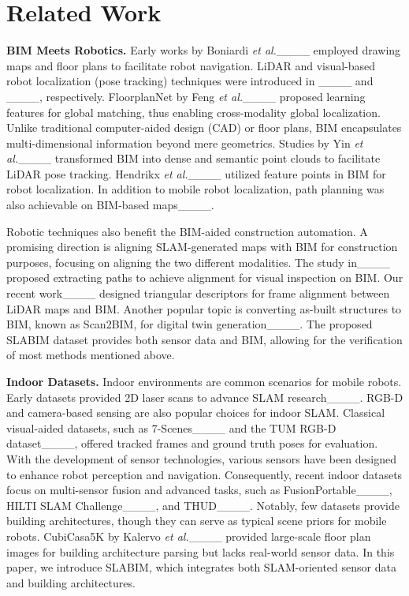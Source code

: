 \section{Related Work}
\label{sec:related work}

\textbf{BIM Meets Robotics.} Early works by Boniardi \textit{et al.}____ employed drawing maps and floor plans to facilitate robot navigation. LiDAR and visual-based robot localization (pose tracking) techniques were introduced in ____ and ____, respectively. FloorplanNet by Feng \textit{et al.}____ proposed learning features for global matching, thus enabling cross-modality global localization. Unlike traditional computer-aided design
(CAD) or floor plans, BIM encapsulates multi-dimensional information beyond mere geometrics. Studies by Yin \textit{et al.}____ transformed BIM into dense and semantic point clouds to facilitate LiDAR pose tracking. Hendrikx \textit{et al.}____ utilized feature points in BIM for robot localization. In addition to mobile robot localization, path planning was also achievable on BIM-based maps____.

Robotic techniques also benefit the BIM-aided construction automation. A promising direction is aligning SLAM-generated maps with BIM for construction purposes, focusing on aligning the two different modalities. The study in____ proposed extracting paths to achieve alignment for visual inspection on BIM. Our recent work____ designed triangular descriptors for frame alignment between LiDAR maps and BIM. Another popular topic is converting as-built structures to BIM, known as Scan2BIM, for digital twin generation____. The proposed SLABIM dataset provides both sensor data and BIM, allowing for the verification of most methods mentioned above.

\textbf{Indoor Datasets.} Indoor environments are common scenarios for mobile robots. Early datasets provided 2D laser scans to advance SLAM research____. RGB-D and camera-based sensing are also popular choices for indoor SLAM. Classical visual-aided datasets, such as 7-Scenes____ and the TUM RGB-D dataset____, offered tracked frames and ground truth poses for evaluation. With the development of sensor technologies, various sensors have been designed to enhance robot perception and navigation. Consequently, recent indoor datasets focus on multi-sensor fusion and advanced tasks, such as FusionPortable____, HILTI SLAM Challenge____, and THUD____. Notably, few datasets provide building architectures, though they can serve as typical scene priors for mobile robots. CubiCasa5K by Kalervo \textit{et al.}____ provided large-scale floor plan images for building architecture parsing but lacks real-world sensor data. In this paper, we introduce SLABIM, which integrates both SLAM-oriented sensor data and building architectures.